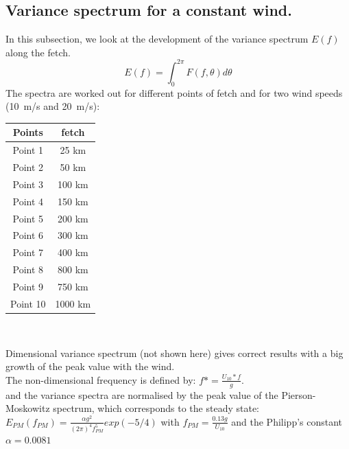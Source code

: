 \subsection{Variance spectrum for a constant wind.}
In this subsection, we look at the development of the variance spectrum $E(f)$ along the fetch.
\[ E(f) = \int_{0}^{2\pi} F(f,\theta )d\theta
\]
The spectra are worked out for different points of fetch and for two wind speeds (10~m/s and 20~m/s):\\
\begin{center}
\begin{tabular}{c|c}
Points & fetch\\
\hline
Point 1 & 25 km \\
Point 2 & 50 km \\
Point 3 & 100 km \\
Point 4 & 150 km \\
Point 5 & 200 km\\
Point 6 & 300 km \\
Point 7 & 400 km \\
Point 8 & 800 km\\
Point 9 & 750 km\\
Point 10 & 1000 km\\
\end{tabular}\\
\end{center}
Dimensional variance spectrum (not shown here) gives correct results with a big growth of the peak value with the wind.\\
The non-dimensional frequency is defined by: $f* = \frac{U_{10}*f}{g}$.\\
and the variance spectra are normalised by the peak value of the Pierson-Moskowitz spectrum, which corresponds to the steady state:\\
$E_{PM}(f_{PM}) = \frac{\alpha g^2}{(2\pi)^4 f_{PM}^5} exp(-5/4)$ with $f_{PM}=\frac{0.13 g}{U_{10}}$ and the Philipp's constant $\alpha = 0.0081$\\

